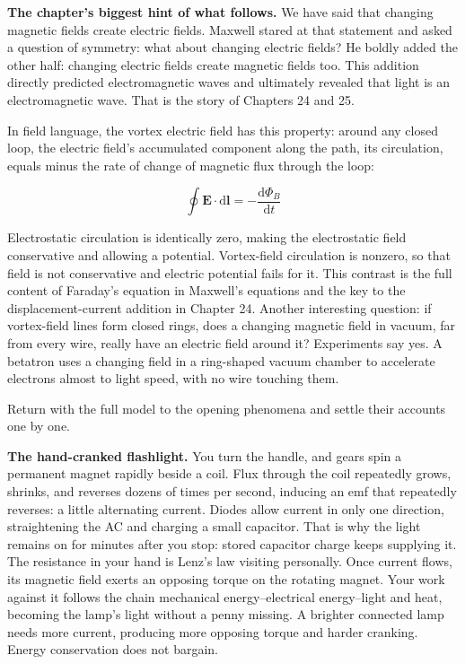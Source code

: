 \textbf{The chapter's biggest hint of what follows.} We have said that changing magnetic fields create electric fields. Maxwell stared at that statement and asked a question of symmetry: what about changing electric fields? He boldly added the other half: changing electric fields create magnetic fields too. This addition directly predicted electromagnetic waves and ultimately revealed that light is an electromagnetic wave. That is the story of Chapters 24 and 25.

\begin{challenge}
In field language, the vortex electric field has this property: around any closed loop, the electric field's accumulated component along the path, its circulation, equals minus the rate of change of magnetic flux through the loop:

\[
\oint\mathbf{E}\cdot\mathrm{d}\mathbf{l}=-\frac{\mathrm{d}\Phi_B}{\mathrm{d}t}
\]

Electrostatic circulation is identically zero, making the electrostatic field conservative and allowing a potential. Vortex-field circulation is nonzero, so that field is not conservative and electric potential fails for it. This contrast is the full content of Faraday's equation in Maxwell's equations and the key to the displacement-current addition in Chapter 24. Another interesting question: if vortex-field lines form closed rings, does a changing magnetic field in vacuum, far from every wire, really have an electric field around it? Experiments say yes. A betatron uses a changing field in a ring-shaped vacuum chamber to accelerate electrons almost to light speed, with no wire touching them.
\end{challenge}


Return with the full model to the opening phenomena and settle their accounts one by one.

\textbf{The hand-cranked flashlight.} You turn the handle, and gears spin a permanent magnet rapidly beside a coil. Flux through the coil repeatedly grows, shrinks, and reverses dozens of times per second, inducing an emf that repeatedly reverses: a little alternating current. Diodes allow current in only one direction, straightening the AC and charging a small capacitor. That is why the light remains on for minutes after you stop: stored capacitor charge keeps supplying it. The resistance in your hand is Lenz's law visiting personally. Once current flows, its magnetic field exerts an opposing torque on the rotating magnet. Your work against it follows the chain mechanical energy--electrical energy--light and heat, becoming the lamp's light without a penny missing. A brighter connected lamp needs more current, producing more opposing torque and harder cranking. Energy conservation does not bargain.

